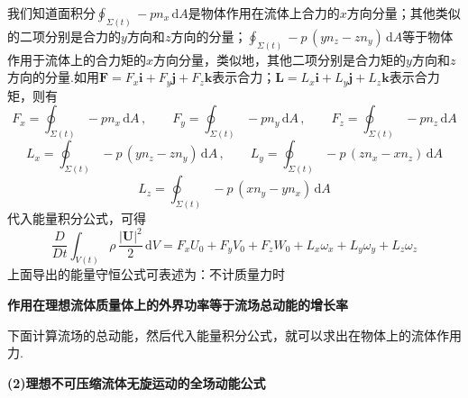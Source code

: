我们知道面积分$\displaystyle\oint_{\Sigma(t)}-p n_x\,\mathrm{d}A$是物体作用在流体上合力的$x$方向分量；其他类似的二项分别是合力的$y$方向和$z$方向的分量；$\displaystyle\oint_{\Sigma(t)}-p\,(y n_z-z n_y)\,\mathrm{d}A$等于物体作用于流体上的合力矩的$x$方向分量，类似地，其他二项分别是合力矩的$y$方向和$z$方向的分量.如用$\boldsymbol{F}=F_x\boldsymbol{i}+F_y\boldsymbol{j}+F_z\boldsymbol{k}$表示合力；$\boldsymbol{L}=L_x\boldsymbol{i}+L_y\boldsymbol{j}+L_z\boldsymbol{k}$表示合力矩，则有
\[
F_x=\oint_{\Sigma(t)}-p n_x\,\mathrm{d}A\,,\qquad F_y=\oint_{\Sigma(t)}-p n_y\,\mathrm{d}A\,,\qquad F_z=\oint_{\Sigma(t)}-p n_z\,\mathrm{d}A
\]
\[
L_x=\oint_{\Sigma(t)}-p\,(y n_z-z n_y)\,\mathrm{d}A\,,\qquad L_y=\oint_{\Sigma(t)}-p\,(z n_x-x n_z)\,\mathrm{d}A
\]
\[
L_z=\oint_{\Sigma(t)}-p\,(x n_y-y n_x)\,\mathrm{d}A
\]
代入能量积分公式，可得
\[
\frac{D}{Dt}\int_{V(t)}\rho\,\frac{|\boldsymbol{U}|^{2}}{2}\,\mathrm{d}V=F_x U_0+F_y V_0+F_z W_0+L_x\omega_x+L_y\omega_y+L_z\omega_z
\]
上面导出的能量守恒公式可表述为：不计质量力时

\textbf{作用在理想流体质量体上的外界功率等于流场总动能的增长率}

下面计算流场的总动能，然后代入能量积分公式，就可以求出在物体上的流体作用力.

\textbf{(2)理想不可压缩流体无旋运动的全场动能公式}

